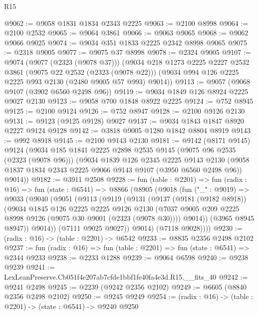 \begin{lexlean}{R15}
\begin{coremodule}
@9062 := @9058 @1831 @1834 @2343 @2225
@9063 := @2100 @8998
@9064 := @2100 @2532
@9065 := @9064 @3861
@9066 := @9063 @9065
@9068 := @9062 @9066 @9025
@9074 := @9034 @351 @1833 @2225 @2342 @8998 @9065
@9075 := @2318 @9005
@9077 := @9075 @37 @8998
@9078 := @2324 @9005
@9107 := @9074
    (@9077 (@2323 (@9078 @37)))
    (@9034
      @218
      @1273
      @2225
      @2227
      @2532
      @3861
      (@9075 @22 @2532 (@2323 (@9078 @22)))
      (@9034 @994 @126 @2225 @2225 @993 @2130 (@2480 @9005 @57 @993) @9014))
@9113 := @9057 (@9068 @9107 (@3902 @6560 @2498 @96))
@9119 := @9034 @1849 @126 @8924 @2225 @9027 @2130
@9123 := @9058 @700 @1848 @8922 @2225
@9124 := @752 @8945
@9125 := @2100 @9124
@9126 := @752 @8947
@9128 := @2100 @9126 @2130
@9131 := @9123 (@9125 @9128) @9027
@9137 := @9034 @1843 @1847 @8920 @2227 @9124 @9128
@9142 := @3818 @9005 @1280 @1842 @8804 @8919
@9143 := @992 @8918
@9145 := @2100 @9143 @2130
@9181 := @9142
    (@8171 @9145)
    @9124
    (@9034
      @185
      @1841
      @2225
      @2898
      @2535
      @9145
      (@9075 @96 @2535 (@2323 (@9078 @96)))
      (@9034
        @1839
        @126
        @2345
        @2225
        @9143
        @2130
        (@9058 @1837 @1834 @2343 @2225 @9066 @9143 @9107 (@3950 @6560 @2498 @96))
        @9014))
@9182 := @3911 @2508
@9228 := fun (table : @2201) =>
  fun (radix : @16) =>
  fun (state : @6541) =>
  @8866
    (@8905
      (@9018
        (fun ("_" : @9019) =>
        @9033
          (@9040
            (@9051
              (@9113
                (@9119
                  (@9131
                    (@9137
                      (@9181 (@9182 @8918))
                      (@9034
                        @1845
                        @126
                        @2225
                        @2225
                        @9126
                        @2130
                        (@7037 @9005 @209 @2225 @8998 @9126 (@9075 @30 @9001 (@2323 (@9078 @30))))
                        @9014))
                    (@3965 @8945 @8947))
                  @9014))
              (@7111 @9025 @9027))
            @9014)
          (@7118 @9028))))
@9230 := (radix : @16) -> (table : @2201) -> @6542
@9233 := @8835 @2356 @2498 @2102
@9237 := fun (radix : @16) => fun (table : @2201) => fun (state : @6541) => @2344 @9233
@9238 := @2233 @1288
@9239 := @9064 @6598
@9240 := @9238 @9239
@9241 := LexLeanPreserve.Cb051f4e207ab7cfde1bbf1fe40fa4e3d.R15.__fits_40
@9242 := @9241 @2498
@9245 := @2239 (@9242 @2356 @2102)
@9249 := @6605 (@8840 @2356 @2498 @2102)
@9250 := @9245 @9249
@9254 := (radix : @16) -> (table : @2201) -> (state : @6541) -> @9240 @9250

\end{coremodule}
\end{lexlean}
